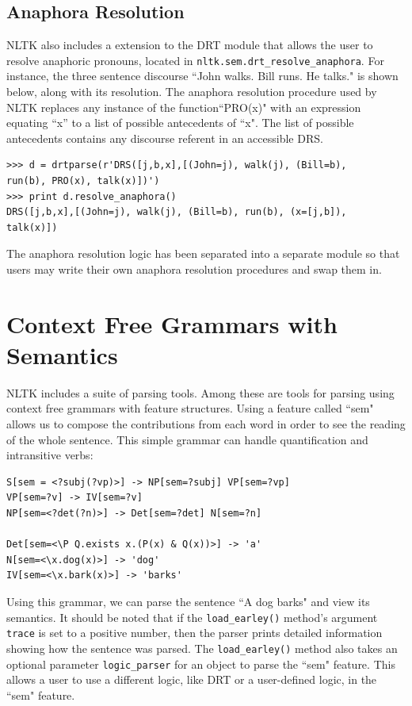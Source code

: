 \documentclass[11pt]{article}
\newcommand{\dhgcode}[1]{{\tt #1}}
\begin{document}
\subsection{Anaphora Resolution}
NLTK also includes a extension to the DRT module that allows the user to resolve anaphoric pronouns, located in \dhgcode{nltk.sem.drt\_resolve\_anaphora}.  For instance, the three sentence discourse ``John walks.  Bill runs.  He talks." is shown below, along with its resolution.  The anaphora resolution procedure used by NLTK replaces any instance of the function``PRO(x)" with an expression equating ``x'' to a list of possible antecedents of ``x".  The list of possible antecedents contains any discourse referent in an accessible DRS.

\begin{verbatim}
>>> d = drtparse(r'DRS([j,b,x],[(John=j), walk(j), (Bill=b), 
run(b), PRO(x), talk(x)])')
>>> print d.resolve_anaphora()
DRS([j,b,x],[(John=j), walk(j), (Bill=b), run(b), (x=[j,b]), 
talk(x)])
\end{verbatim}

The anaphora resolution logic has been separated into a separate module so that users may write their own anaphora resolution procedures and swap them in.


\section{Context Free Grammars with Semantics}
NLTK includes a suite of parsing tools.  Among these are tools for parsing using context free grammars with feature structures.  Using a feature called ``sem" allows us to compose the contributions from each word in order to see the reading of the whole sentence.  This simple grammar can handle quantification and intransitive verbs:

\begin{verbatim}
S[sem = <?subj(?vp)>] -> NP[sem=?subj] VP[sem=?vp]
VP[sem=?v] -> IV[sem=?v]
NP[sem=<?det(?n)>] -> Det[sem=?det] N[sem=?n]

Det[sem=<\P Q.exists x.(P(x) & Q(x))>] -> 'a'
N[sem=<\x.dog(x)>] -> 'dog'
IV[sem=<\x.bark(x)>] -> 'barks'
\end{verbatim}

Using this grammar, we can parse the sentence ``A dog barks" and view its semantics.  It should be noted that if the \dhgcode{load\_earley()} method's argument \dhgcode{trace} is set to a positive number, then the parser prints detailed information showing how the sentence was parsed.  The \dhgcode{load\_earley()} method also takes an optional parameter \dhgcode{logic\_parser} for an object to parse the ``sem" feature.  This allows a user to use a different logic, like DRT or a user-defined logic, in the ``sem" feature.
\end{document}
